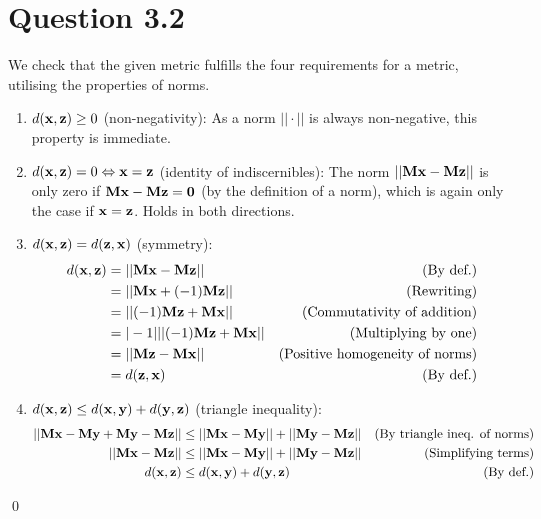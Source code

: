 \section*{Question 3.2}
We check that the given metric fulfills the four requirements for a
metric, utilising the properties of norms.

\begin{enumerate}
\item $d(\bold{x},\bold{z}) \geq 0$ (non-negativity): As a norm
  $||\cdot||$ is always non-negative, this property is immediate.
\item $d(\bold{x},\bold{z}) = 0 \Leftrightarrow \bold{x}=\bold{z}$ (identity of
  indiscernibles): The norm $||\bold{Mx}-\bold{Mz}||$ is only zero if
  $\bold{Mx}-\bold{Mz}=\bold{0}$ (by the definition of a norm), which
  is again only the case if $\bold{x}=\bold{z}$.  Holds in both
  directions.
\item $d(\bold{x},\bold{z}) = d(\bold{z},\bold{x})$ (symmetry):
  \begin{align*}
    d(\bold{x},\bold{z})&=||\bold{Mx}-\bold{Mz}||&\text{(By def.)} \\
    &=||\bold{Mx}+(-1)\bold{Mz}||&\text{(Rewriting)} \\
    &=||(-1)\bold{Mz}+\bold{Mx}||&\text{(Commutativity of addition)} \\
    &=|-1|||(-1)\bold{Mz}+\bold{Mx}||&\text{(Multiplying by one)} \\
    &=||\bold{Mz}-\bold{Mx}||&\text{(Positive homogeneity of norms)} \\
    &=d(\bold{z},\bold{x})&\text{(By def.)}
\end{align*}
\item $d(\bold{x}, \bold{z}) \leq d(\bold{x}, \bold{y}) + d(\bold{y},
  \bold{z})$ (triangle inequality):
  \begin{align*}
    ||\bold{Mx}-\bold{My}+\bold{My}-\bold{Mz}|| &\leq ||\bold{Mx}-\bold{My}|| + ||\bold{My}-\bold{Mz}||&\text{(By triangle ineq. of norms)}\\
    ||\bold{Mx}-\bold{Mz}|| &\leq ||\bold{Mx}-\bold{My}|| + ||\bold{My}-\bold{Mz}||&\text{(Simplifying terms)}\\
    d(\bold{x}, \bold{z}) &\leq d(\bold{x}, \bold{y}) + d(\bold{y}, \bold{z})&\text{(By def.)}
  \end{align*}
\end{enumerate}\qed